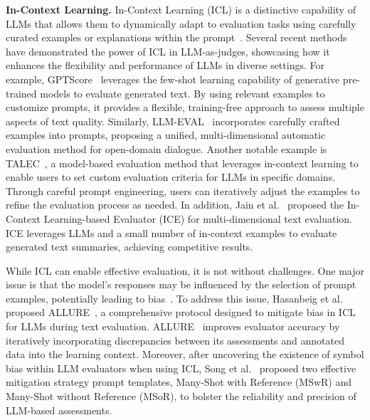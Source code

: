 \textbf{In-Context Learning.} In-Context Learning (ICL) is a distinctive capability of LLMs that allows them to dynamically adapt to evaluation tasks using carefully curated examples or explanations within the prompt~\cite{dong2022survey}. Several recent methods have demonstrated the power of ICL in LLM-as-judges, showcasing how it enhances the flexibility and performance of LLMs in diverse settings. For example, GPTScore~\cite{fu2023gptscore} leverages the few-shot learning capability of generative pre-trained models to evaluate generated text. By using relevant examples to customize prompts, it provides a flexible, training-free approach to assess multiple aspects of text quality.
Similarly, LLM-EVAL~\cite{lin2023llm} incorporates carefully crafted examples into prompts, proposing a unified, multi-dimensional automatic evaluation method for open-domain dialogue.
Another notable example is TALEC~\cite{zhang2024talec}, a model-based evaluation method that leverages in-context learning to enable users to set custom evaluation criteria for LLMs in specific domains. Through careful prompt engineering, users can iteratively adjust the examples to refine the evaluation process as needed.
In addition, Jain et al.~\cite{jain2023multi} proposed the In-Context Learning-based Evaluator (ICE) for multi-dimensional text evaluation. ICE leverages LLMs and a small number of in-context examples to evaluate generated text summaries, achieving competitive results.

While ICL can enable effective evaluation, it is not without challenges. One major issue is that the model's responses may be influenced by the selection of prompt examples, potentially leading to bias~\cite{zhao2021calibrate,zhou2023batch,han2022prototypical,fei2023mitigating}.
To address this issue, Hasanbeig et al. proposed ALLURE~\cite{hasanbeig2023allure}, a comprehensive protocol designed to mitigate bias in ICL for LLMs during text evaluation. ALLURE~\cite{hasanbeig2023allure} improves evaluator accuracy by iteratively incorporating discrepancies between its assessments and annotated data into the learning context. Moreover, after uncovering the existence of symbol bias within LLM evaluators when using ICL, Song et al.~\cite{song2024can} proposed two effective mitigation strategy prompt templates, Many-Shot with Reference (MSwR) and Many-Shot without Reference (MSoR), to bolster the reliability and precision of LLM-based assessments.






